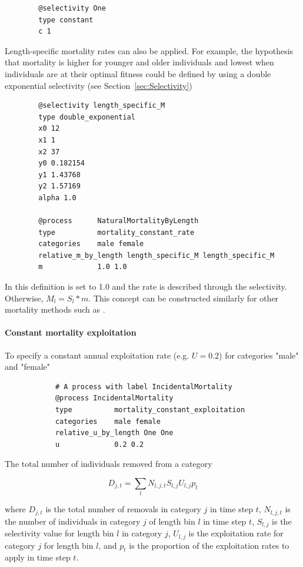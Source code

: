 {\small{\begin{verbatim}
		@selectivity One
		type constant
		c 1
		\end{verbatim}}}

Length-specific mortality rates can also be applied. For example, the hypothesis that mortality is higher for younger and older individuals and lowest when individuals are at their optimal fitness could be defined by using a double exponential selectivity (see Section~\ref{sec:Selectivity})

{\small{\begin{verbatim}
		@selectivity length_specific_M
		type double_exponential
		x0 12
		x1 1
		x2 37
		y0 0.182154
		y1 1.43768
		y2 1.57169
		alpha 1.0
		
		@process      NaturalMortalityByLength
		type          mortality_constant_rate
		categories    male female
		relative_m_by_length length_specific_M length_specific_M
		m             1.0 1.0
		\end{verbatim}}}


In this definition  is set to 1.0 and the rate is described through the selectivity. Otherwise, $M_{l} = S_{l} * m$. This concept can be constructed similarly for other mortality methods such as .

\paragraph{Constant mortality exploitation}\label{sec:Process-MortalityConstantExploitation} 

To specify a constant annual exploitation rate (e.g. $U=0.2$) for categories "male" and "female"
{\small{\begin{verbatim}
			# A process with label IncidentalMortality
			@process IncidentalMortality
			type          mortality_constant_exploitation
			categories    male female
			relative_u_by_length One One
			u             0.2 0.2
\end{verbatim}}}

The total number of individuals removed from a category

\begin{equation}
	D_{j,t} = \sum_l N_{l,j,t} S_{l,j} U_{l,j} p_t
\end{equation}

where $D_{j,t}$ is the total number of removals in category $j$ in time step $t$, $N_{l,j,t}$ is the number of individuals in category $j$ of length bin $l$ in time step $t$, $S_{l,j}$ is the selectivity value for length bin $l$ in category $j$, $U_{l,j}$ is the exploitation rate for category $j$ for length bin $l$, and $p_t$ is the proportion of the exploitation rates to apply in time step $t$.

